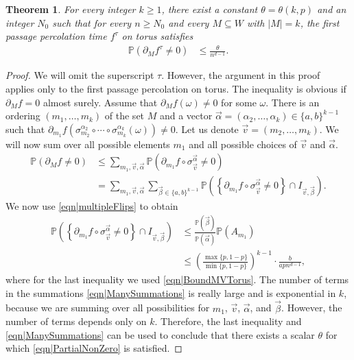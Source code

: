 \documentclass[reqno]{amsart}
\newtheorem{theorem}{Theorem}
\begin{document}
\begin{theorem}\label{thm|PartialNonZero} For every integer $k\geq 1$, there exist a constant $\theta=\theta(k,p)$ and an integer $N_0$ such that for every $n\geq N_0$ and every $M\subseteq W$ with $|M|=k$, the first passage percolation time $f^{\tau}$ on torus satisfies
\begin{align}
\mathbb P\left(\partial_Mf^{\tau}\neq 0\right) &\leq \frac{\theta}{n^{d-1}}.
\label{eqn|PartialNonZero}
\end{align}
\end{theorem}
\begin{proof} We will omit the superscript $\tau$. However, the argument in this proof applies only to the first passage percolation on torus.  
The inequality is obvious if $\partial_Mf=0$ almost surely. Assume that $\partial_Mf(\omega)\neq 0$ for some $\omega$. 
There is an ordering $(m_1, \dots, m_k)$ of the set $M$ and a vector $\overrightarrow\alpha=(\alpha_2,\dots, \alpha_k)\in \{a,b\}^{k-1}$ such that 
 $\partial_{m_1} f(\sigma_{m_2}^{\alpha_2}\circ\cdots\circ \sigma_{m_k}^{\alpha_k}(\omega))\neq 0$. Let us denote $\overrightarrow v=(m_2,\dots, m_k)$. We will now sum over all possible elements $m_1$ and 
 all possible choices of $\overrightarrow v$ and $\overrightarrow \alpha$. 
\begin{align}
\nonumber 
\mathbb P\left(\partial_Mf\neq 0\right)&\leq \sum_{m_1,\overrightarrow v,\overrightarrow \alpha}
\mathbb P\left(\partial_{m_1}f\circ \sigma_{\overrightarrow v}^{\overrightarrow\alpha}\neq 0\right)\\ 
&= 
\sum_{m_1,\overrightarrow v,\overrightarrow \alpha}\sum_{\overrightarrow\beta\in\{a,b\}^{k-1}}
\mathbb P\left(\left\{\partial_{m_1}f\circ \sigma_{\overrightarrow v}^{\overrightarrow\alpha}\neq 0\right\}\cap I_{\overrightarrow v,\overrightarrow \beta}\right) . \label{eqn|ManySummations}
\end{align}
We now use \eqref{eqn|multipleFlips} to obtain 
\begin{align*}\mathbb P\left(\left\{\partial_{m_1}f\circ \sigma_{\overrightarrow v}^{\overrightarrow\alpha}\neq 0\right\}\cap I_{\overrightarrow v,\overrightarrow \beta}\right)
&\leq \frac{\mathbb P\left(\overrightarrow \beta\right)}{\mathbb P\left(\overrightarrow \alpha\right)} \mathbb P\left(A_{m_1}\right)\\
&\leq\left(\frac{\max\{p,1-p\}}{\min\{p,1-p\}}\right)^{k-1}\cdot\frac{b}{apn^{d-1}},
\end{align*}
where for the last inequality we used \eqref{eqn|BoundMVTorus}. The number of terms in the summations 
 \eqref{eqn|ManySummations} is really large and is exponential in $k$, because we are summing over all possibilities for $m_1$, $\overrightarrow v$, $\overrightarrow \alpha$, and $\overrightarrow \beta$. 
 However, the number of terms depends only on $k$. Therefore, the last inequality and \eqref{eqn|ManySummations} can be used to conclude that 
 there exists a scalar $\theta$ for which \eqref{eqn|PartialNonZero} is satisfied.
\end{proof}
 
\end{document}
